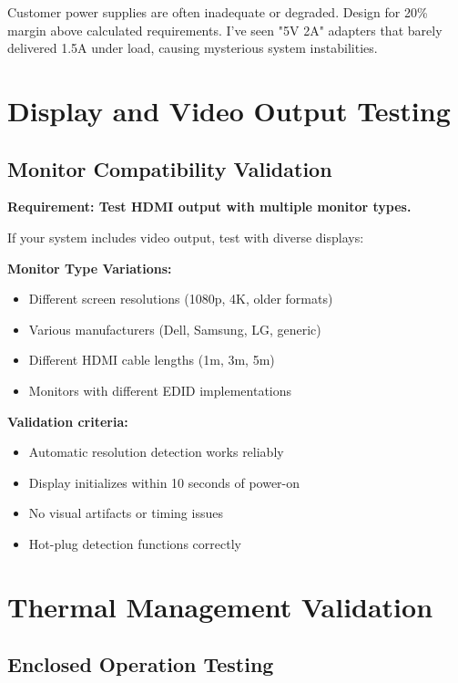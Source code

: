 \begin{tcolorbox}[colback=red!10,colframe=red!75!black,title=Power Supply Reality Check]
Customer power supplies are often inadequate or degraded. Design for 20\% margin above calculated requirements. I've seen "5V 2A" adapters that barely delivered 1.5A under load, causing mysterious system instabilities.
\end{tcolorbox}

\section{Display and Video Output Testing}

\subsection{Monitor Compatibility Validation}

\textbf{Requirement: Test HDMI output with multiple monitor types.}

If your system includes video output, test with diverse displays:

\textbf{Monitor Type Variations:}
\begin{itemize}
\item Different screen resolutions (1080p, 4K, older formats)
\item Various manufacturers (Dell, Samsung, LG, generic)
\item Different HDMI cable lengths (1m, 3m, 5m)
\item Monitors with different EDID implementations
\end{itemize}

\textbf{Validation criteria:}
\begin{itemize}
\item Automatic resolution detection works reliably
\item Display initializes within 10 seconds of power-on
\item No visual artifacts or timing issues
\item Hot-plug detection functions correctly
\end{itemize}

\section{Thermal Management Validation}

\subsection{Enclosed Operation Testing}

